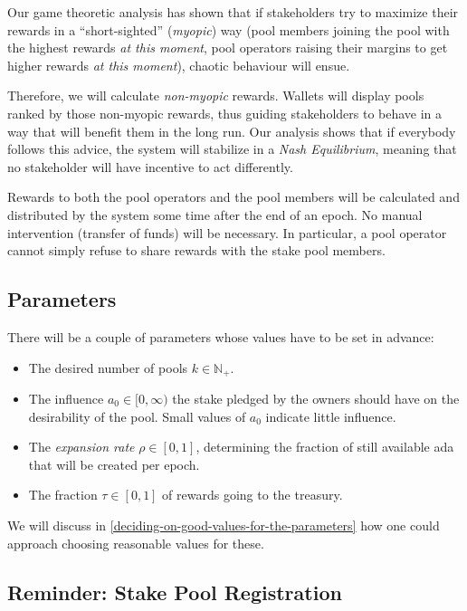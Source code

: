 \documentclass[11pt,a4paper,dvipsnames,twosided]{article}
\begin{document}
Our game theoretic analysis has shown that if stakeholders try to
maximize their rewards in a ``short-sighted'' (\emph{myopic}) way (pool
members joining the pool with the highest rewards \emph{at this moment},
pool operators raising their margins to get higher rewards \emph{at this
moment}), chaotic behaviour will ensue.

Therefore, we will calculate \emph{non-myopic} rewards. Wallets will display
pools ranked by those non-myopic rewards, thus guiding stakeholders to behave in
a way that will benefit them in the long run. Our analysis shows that if
everybody follows this advice, the system will stabilize in a \emph{Nash
  Equilibrium}, meaning that no stakeholder will have incentive to act
differently.

Rewards to both the pool operators and the pool members will be calculated and
distributed by the system some time after the end of an epoch. No manual
intervention (transfer of funds) will be necessary. In particular, a pool
operator cannot simply refuse to share rewards with the stake pool members.

\subsection{Parameters}
\label{parameters}

There will be a couple of parameters whose values have to be set in
advance:

\begin{itemize}
\item
  The desired number of pools \(k\in\mathbb{N}_+\).
\item
  The influence \(a_0\in[0,\infty)\) the stake pledged by the owners should have
    on the desirability of the pool. Small values of \(a_0\) indicate little
    influence.
\item
  The \emph{expansion rate} \(\rho\in[0,1]\), determining the fraction
  of still available ada that will be created per epoch.
\item
  The fraction \(\tau\in[0,1]\) of rewards going to the treasury.
\end{itemize}

We will discuss
in \cref{deciding-on-good-values-for-the-parameters} how one
could approach choosing reasonable values for these.

\subsection{Reminder: Stake Pool Registration}
\label{reminder-stake-pool-registration}
\end{document}
